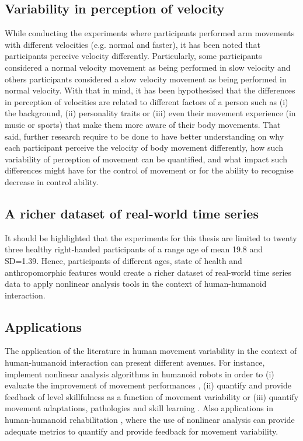 \subsection*{Variability in perception of velocity}
While conducting the experiments where participants performed 
arm movements with different velocities (e.g. normal and faster),
it has been noted that participants perceive velocity differently.
Particularly, some participants considered a normal velocity movement 
as being performed in slow velocity and others participants considered 
a slow velocity movement as being performed in normal velocity. 
With that in mind, it has been hypothesised that the differences 
in perception of velocities are related to different factors 
of a person such as 
(i) the background, 
(ii) personality traits or
(iii) even their movement experience 
(in music or sports) that make them more aware of their body movements. 
That said, further research require to be done to have better 
understanding on why each participant perceive the velocity of 
body movement differently, how such variability of perception 
of movement can be quantified, and 
what impact such differences might have for the control of 
movement or for the ability to recognise decrease in control
ability. 

\subsection*{A richer dataset of real-world time series}
It should be highlighted that the experiments for this thesis are 
limited to twenty three healthy right-handed participants of a 
range age of mean 19.8 and SD=1.39.
Hence, participants of different ages, state of health and 
anthropomorphic features would create a richer dataset of 
real-world time series data to apply nonlinear analysis tools 
in the context of human-humanoid interaction. 

\subsection*{Applications}
The application of the literature in human movement variability 
in the context of human-humanoid interaction can present different
avenues.
For instance, implement nonlinear analysis algorithms in humanoid robots 
in order to 
(i) evaluate the improvement of movement performances \citep{muller2004}, 
(ii) quantify and provide feedback of level skillfulness as a function 
of movement variability \citep{seifert2011} or 
(iii) quantify movement adaptations, pathologies and skill learning 
\citep{preatoni2007, preatoni2010, preatoni2013}.
Also applications in human-humanoid rehabilitation 
\citep{gorer2013, guneysu2015}, 
where the use of nonlinear analysis can provide adequate 
metrics to quantify and provide feedback for movement variability. 


